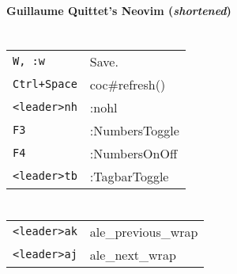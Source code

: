 




\raggedright
\footnotesize

\begin{center}
	\Huge{\textbf{Guillaume Quittet's Neovim (\textit{shortened})}} \\
\end{center}
\vspace*{0.5cm}

\begin{multicols}{3}


	\setlength{\premulticols}{1pt}
	\setlength{\postmulticols}{1pt}
	\setlength{\multicolsep}{1pt}
	\setlength{\columnsep}{2pt}

	\section{}
	\begin{tabular}{@{}ll@{}}
		\verb!W, :w!      & Save.          \\
		\verb!Ctrl+Space! & coc\#refresh() \\
		\verb!<leader>nh! & :nohl          \\
		\verb!F3!         & :NumbersToggle \\
		\verb!F4!         & :NumbersOnOff  \\
		\verb!<leader>tb! & :TagbarToggle  \\
	\end{tabular}

	\section{}
	\begin{tabular}{@{}ll@{}}
		\verb!<leader>ak! & ale\_previous\_wrap \\
		\verb!<leader>aj! & ale\_next\_wrap     \\
	\end{tabular}


\end{multicols}
